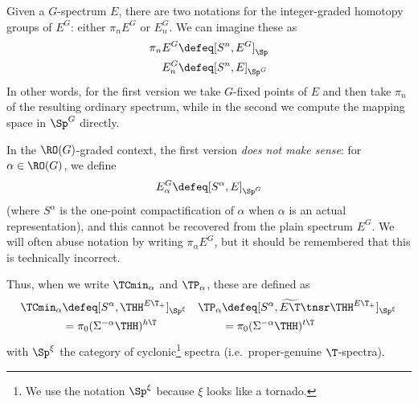 \begin{warning}
  Given a $G$-spectrum $E$, there are two notations for the integer-graded homotopy groups of $E^G$: either $\pi_n E^G$ or $E^G_n$. We can imagine these as
  \begin{align*}
    \pi_n E^G &\defeq [S^n, E^G]_\Sp\\
    E^G_n &\defeq [S^n, E]_{\Sp^G}
  \end{align*}
  In other words, for the first version we take $G$-fixed points of $E$ and then take $\pi_n$ of the resulting ordinary spectrum, while in the second we compute the mapping space in $\Sp^G$ directly.

  In the $\RO(G)$-graded context, the first version \emph{does not make sense}: for $\alpha\in\RO(G)$, we define
  \[ E^G_\alpha \defeq [S^\alpha, E]_{\Sp^G} \]
  (where $S^\alpha$ is the one-point compactification of $\alpha$ when $\alpha$ is an actual representation), and this cannot be recovered from the plain spectrum $E^G$. We will often abuse notation by writing $\pi_\alpha E^G$, but it should be remembered that this is technically incorrect.

  Thus, when we write $\TCmin_\alpha$ and $\TP_\alpha$, these are defined as
  \begin{align*}
    \TCmin_\alpha &\defeq [S^\alpha, \THH^{E\T_+}]_{\Sp^\xi} &
    \TP_\alpha &\defeq [S^\alpha, \widetilde{E\T}\tnsr \THH^{E\T_+}]_{\Sp^\xi}\\
    &= \pi_0 (\Sigma^{-\alpha} \THH)^{h\T} &
    &= \pi_0 (\Sigma^{-\alpha} \THH)^{t\T}
  \end{align*}
  with $\Sp^\xi$ the category of cyclonic\footnote{We use the notation $\Sp^\xi$ because $\xi$ looks like a tornado.} spectra (i.e.\ proper-genuine $\T$-spectra).
\end{warning}

